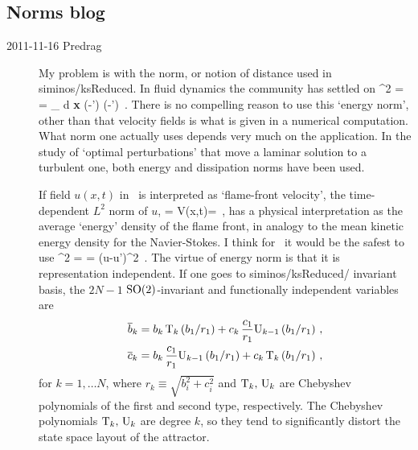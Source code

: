 \subsection{Norms blog}

\begin{description}
\item[2011-11-16 Predrag] My problem is with the norm, or notion of
distance used in siminos/ksReduced. In fluid dynamics the community has
settled on
\beq
  ^2  =  =
\int_\Omega \! d {\bf x} \;
(-') \cdot (-')
\,.
\label{innerproduct} \eeq
There is no compelling reason to use this {`energy norm'}, other than
that velocity fields is what is given in a numerical computation. What
norm one actually uses depends very much on the application. In the study
of `optimal perturbations' that move a laminar solution to a turbulent
one, both energy \citep{TeHaHe10} and dissipation \citep{LoCaCoPeGo11}
norms have been used.

If field $u(x,t)$ in \KSe\  is interpreted as
`flame-front velocity', the time-dependent $L^2$ norm
of $u$,
\beq
  \expctE= \Lint{\pSpace} V(x,t)= \Lint{\pSpace} 
  \,,
  \label{ksEnergyFreeze}
\eeq
has a physical interpretation as the average `energy'
density of the flame front, in analogy to the mean kinetic energy
density for the Navier-Stokes.
I think for \KS\ it would be the safest to use
\beq
  ^2  =  =
\Lint{\pSpace} ({u}-{u}')^2
\,.
\label{KSnormFr} \eeq
The virtue of energy norm is that it is representation independent. If
one goes to siminos/ksReduced/ invariant basis, the $2N-1$
$\textrm{SO}(2)$-invariant and functionally independent variables are
\bseq\label{eq:SO2cheb}
  \begin{align}
    \overline{b}_k &=
		    b_k\, \mathrm{T}_k\left(b_1/r_1\right)+
		    c_k\,\frac{c_1}{r_1} \mathrm{U}_{k-1}\left(b_1/r_1\right)\,, \label{eq:SO2cheb1}\\
    \overline{c}_k &=
		    b_k\, \frac{c_1}{r_1} \mathrm{U}_{k-1}\left(b_1/r_1\right)+
		    c_k\,\mathrm{T}_k\left(b_1/r_1\right)\,,  \label{eq:SO2cheb2}
  \end{align}
\eseq
for $k=1,\ldots N$, where $r_k\equiv\sqrt{b_i^2+c_i^2}$ and $\mathrm{T}_k,\,\mathrm{U}_k$
are Chebyshev polynomials of the first and second type, respectively.
The Chebyshev polynomials $\mathrm{T}_k,\,\mathrm{U}_k$ are degree $k$, so they tend
to significantly distort the state space layout of the attractor.


\end{description}
